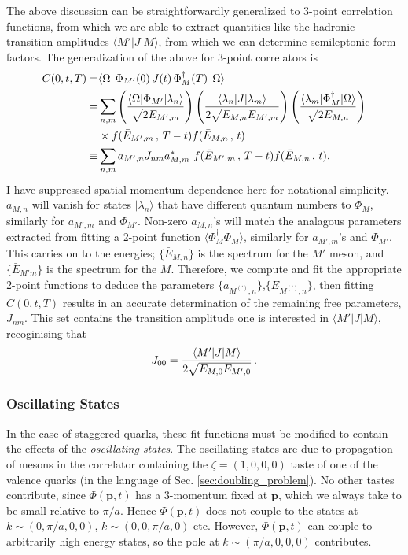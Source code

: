 The above discussion can be straightforwardly generalized to 3-point correlation functions, from which we are able to extract quantities like the hadronic transition amplitudes $\langle M' | J | M \rangle$, from which we can determine semileptonic form factors. The generalization of the above for 3-point correlators is
\begin{align}
  \nonumber
  C(0,t,T) =& \langle \Omega | \, \Phi_{M'}(0)\, J(t)\, \Phi_{M}^{\dagger}(T)\, | \Omega \rangle
  \\ \nonumber
  =& \sum_{n,m}  \left( {\langle \Omega | \Phi_{M'} | \lambda_n \rangle \over \sqrt{2E_{M',m}}} \right) \left({\langle \lambda_n | J | \lambda_m \rangle \over 2\sqrt{ E_{M,n} E_{M',m} } }\right) \left( {\langle \lambda_m | \Phi_{M}^{\dagger} | \Omega \rangle \over \sqrt{2E_{M,n}} } \right) \\ \nonumber &\times f(\bar{E}_{M',m}\,,\,T-t) f(\bar{E}_{M,n}\,,\,t) \\
  \equiv& \sum_{n,m} a_{M',n} J_{nm} a^*_{M,m} \,\, f(\bar{E}_{M',m}\,,\,T-t) f(\bar{E}_{M,n}\,,\,t).
  \label{eq:3ptfitfunction}
\end{align}
I have suppressed spatial momentum dependence here for notational simplicity. $a_{M,n}$ will vanish for states $|\lambda_n\rangle$ that have different quantum numbers to $\Phi_{M}$, similarly for $a_{M',m}$ and $\Phi_{M'}$. Non-zero $a_{M,n}$'s will match the analagous parameters extracted from fitting a 2-point function $\langle \Phi_{M}^{\dagger} \Phi_{M} \rangle$, similarly for $a_{M',m}$'s and $\Phi_{M'}$. This carries on to the energies; $\{\bar{E}_{M,n}\}$ is the spectrum for the $M'$ meson, and $\{\bar{E}_{M'm}\}$ is the spectrum for the $M$. Therefore, we compute and fit the appropriate 2-point functions to deduce the parameters $\{a_{M^{(')},n}\}$,$\{\bar{E}_{M^{(')},n}\}$, then fitting $C(0,t,T)$ results in an accurate determination of the remaining free parameters, $J_{nm}$. This set contains the transition amplitude one is interested in $\langle M' | J | M \rangle$, recoginising that
\begin{align}
  J_{00} = {\langle M' | J | M \rangle \over 2\sqrt{E_{M,0} E_{M',0} } }\,.
\end{align}

\subsubsection{Oscillating States}

In the case of staggered quarks, these fit functions must be modified to contain the effects of the {\it{oscillating states}}. The oscillating states are due to propagation of mesons in the correlator containing the $\zeta=(1,0,0,0)$ taste of one of the valence quarks (in the language of Sec. \ref{sec:doubling_problem}). No other tastes contribute, since $\Phi({{\textbf{p}}},t)$ has a 3-momentum fixed at ${\textbf{p}}$, which we always take to be small relative to $\pi/a$. Hence $\Phi({\textbf{p}},t)$ does not couple to the states at $k\sim(0,\pi/a,0,0)$, $k\sim(0,0,\pi/a,0)$ etc. However, $\Phi({\textbf{p}},t)$ can couple to arbitrarily high energy states, so the pole at $k\sim(\pi/a,0,0,0)$ contributes.

